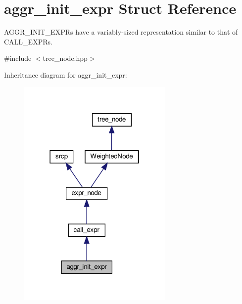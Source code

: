 \hypertarget{structaggr__init__expr}{}\section{aggr\+\_\+init\+\_\+expr Struct Reference}
\label{structaggr__init__expr}


A\+G\+G\+R\+\_\+\+I\+N\+I\+T\+\_\+\+E\+X\+P\+Rs have a variably-\/sized representation similar to that of C\+A\+L\+L\+\_\+\+E\+X\+P\+Rs.  




{\ttfamily \#include $<$tree\+\_\+node.\+hpp$>$}



Inheritance diagram for aggr\+\_\+init\+\_\+expr\+:
\nopagebreak
\begin{figure}[H]
\begin{center}
\leavevmode
\includegraphics[width=214pt]{d5/dc3/structaggr__init__expr__inherit__graph}
\end{center}
\end{figure}


